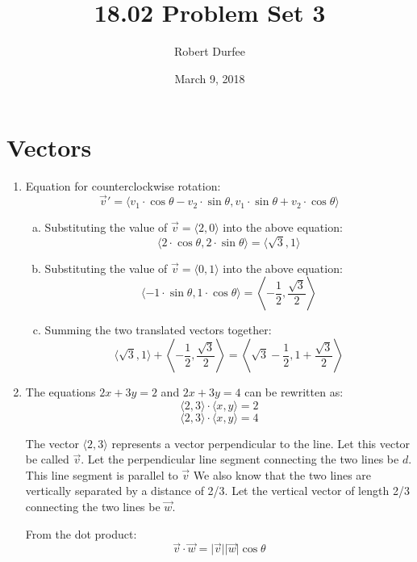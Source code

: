 \documentclass{article}
\title{ 18.02 Problem Set 3 }
\author{ Robert Durfee }
\date{ March 9, 2018 }
\begin{document}
\maketitle

\section{ Vectors }

\begin{enumerate}[1.]
  \item Equation for counterclockwise rotation:
    $$ \vec{v}' = \langle v_{1} \cdot \cos \theta - v_{2} \cdot \sin \theta,
    v_{1} \cdot \sin \theta + v_{2} \cdot \cos \theta \rangle $$
    \begin{enumerate}[a.]
      \item Substituting the value of $\vec{v} = \langle 2, 0 \rangle $ into the
        above equation:
        $$ \langle 2 \cdot \cos \theta, 2 \cdot \sin \theta \rangle = \langle
        \sqrt{3}, 1 \rangle$$
      \item Substituting the value of $\vec{v} = \langle 0, 1 \rangle $ into the
        above equation:
        $$ \langle -1 \cdot \sin \theta, 1 \cdot \cos \theta \rangle =
        \left\langle -\frac{ 1 }{ 2 }, \frac{ \sqrt{3} }{ 2 } \right\rangle $$
      \item Summing the two translated vectors together:
        $$\langle \sqrt{3}, 1 \rangle + \left\langle -\frac{ 1 }{ 2 }, \frac{
          \sqrt{3} }{ 2 } \right\rangle = \left\langle \sqrt{3} - \frac{ 1 }{ 2
        }, 1 + \frac{ \sqrt{3} }{ 2 } \right\rangle $$
    \end{enumerate}
  \item The equations $2x + 3y = 2$ and $2x + 3y = 4$ can be rewritten as:
    $$ \langle 2, 3 \rangle \cdot \langle x, y \rangle = 2 $$
    $$ \langle 2, 3 \rangle \cdot \langle x, y \rangle = 4 $$

    The vector $\langle 2, 3 \rangle$ represents a vector perpendicular to the
    line. Let this vector be called $\vec{v}$. Let the perpendicular line
    segment connecting the two lines be $d$.  This line segment is parallel to
    $\vec{v}$ We also know that the two lines are vertically separated by a
    distance of 2/3.  Let the vertical vector of length 2/3 connecting the two
    lines be $\vec{w}$.

    \bigbreak

    From the dot product:
    $$ \vec{v} \cdot \vec{w} = \vert \vec{v} \vert \vert \vec{w} \vert \cos
    \theta $$


\end{enumerate}
\end{document}
